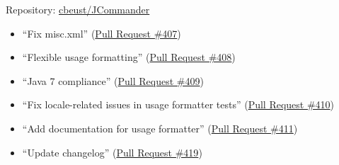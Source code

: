 \documentclass[12pt, letterpaper]{article}
\begin{document}
Repository: \href{https://github.com/cbeust/jcommander}{cbeust/JCommander}
\begin{itemize}
  \item ``Fix misc.xml'' (\href{https://github.com/cbeust/jcommander/pull/407}{Pull Request \#407})
  \item ``Flexible usage formatting'' (\href{https://github.com/cbeust/jcommander/pull/408}{Pull Request \#408})
  \item ``Java 7 compliance'' (\href{https://github.com/cbeust/jcommander/pull/409}{Pull Request \#409})
  \item ``Fix locale-related issues in usage formatter tests'' (\href{https://github.com/cbeust/jcommander/pull/410}{Pull Request \#410})
  \item ``Add documentation for usage formatter'' (\href{https://github.com/cbeust/jcommander/pull/411}{Pull Request \#411})
  \item ``Update changelog'' (\href{https://github.com/cbeust/jcommander/pull/419}{Pull Request \#419})
\end{itemize}
\end{document}
